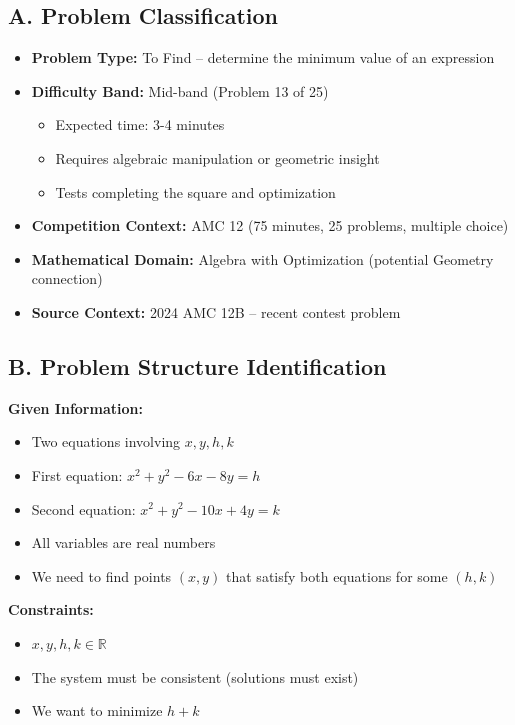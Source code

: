 \documentclass[12pt]{article}
\begin{document}
\begin{problemconfigbox}
\subsection*{A. Problem Classification}

\begin{itemize}[leftmargin=*]
    \item \textbf{Problem Type:} To Find -- determine the minimum value of an expression
    \item \textbf{Difficulty Band:} Mid-band (Problem 13 of 25)
    \begin{itemize}
        \item Expected time: 3-4 minutes
        \item Requires algebraic manipulation or geometric insight
        \item Tests completing the square and optimization
    \end{itemize}
    \item \textbf{Competition Context:} AMC 12 (75 minutes, 25 problems, multiple choice)
    \item \textbf{Mathematical Domain:} Algebra with Optimization (potential Geometry connection)
    \item \textbf{Source Context:} 2024 AMC 12B -- recent contest problem
\end{itemize}

\subsection*{B. Problem Structure Identification}

\textbf{Given Information:}
\begin{itemize}
    \item Two equations involving $x, y, h, k$
    \item First equation: $x^2 + y^2 - 6x - 8y = h$
    \item Second equation: $x^2 + y^2 - 10x + 4y = k$
    \item All variables are real numbers
    \item We need to find points $(x, y)$ that satisfy both equations for some $(h, k)$
\end{itemize}

\textbf{Constraints:}
\begin{itemize}
    \item $x, y, h, k \in \mathbb{R}$
    \item The system must be consistent (solutions must exist)
    \item We want to minimize $h + k$
\end{itemize}


\end{problemconfigbox}
\end{document}
